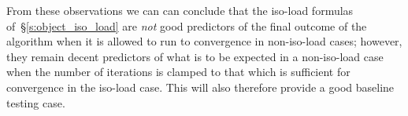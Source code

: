 From these observations we can can conclude that the iso-load formulas
of~\S\ref{s:object_iso_load} are \emph{not} good predictors of the
final outcome of the algorithm when it is allowed to run to
convergence in non-iso-load cases; however, they remain decent
predictors of what is to be expected in a non-iso-load case when the
number of iterations is clamped to that which is sufficient for
convergence in the iso-load case. This will also therefore provide a
good baseline testing case.